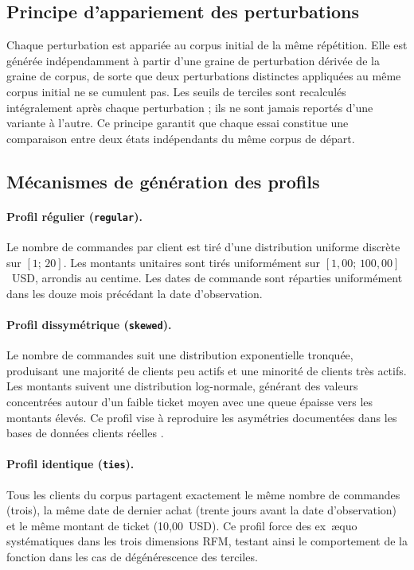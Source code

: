 \subsection{Principe d'appariement des perturbations}
\label{subsec:methodes-appariement}

Chaque perturbation est appariée au corpus initial de la même répétition. Elle est
générée indépendamment à partir d'une graine de perturbation dérivée de la graine de
corpus, de sorte que deux perturbations distinctes appliquées au même corpus initial
ne se cumulent pas. Les seuils de terciles sont recalculés intégralement après chaque
perturbation ; ils ne sont jamais reportés d'une variante à l'autre. Ce principe garantit
que chaque essai constitue une comparaison entre deux états indépendants du même corpus
de départ.

\subsection{Mécanismes de génération des profils}
\label{subsec:methodes-generateurs}

\paragraph{Profil régulier (\texttt{regular}).}
Le nombre de commandes par client est tiré d'une distribution uniforme discrète sur
$[1;\, 20]$. Les montants unitaires sont tirés uniformément sur $[1{,}00;\, 100{,}00]$~USD,
arrondis au centime. Les dates de commande sont réparties uniformément dans les douze mois
précédant la date d'observation.

\paragraph{Profil dissymétrique (\texttt{skewed}).}
Le nombre de commandes suit une distribution exponentielle tronquée, produisant une
majorité de clients peu actifs et une minorité de clients très actifs. Les montants
suivent une distribution log-normale, générant des valeurs concentrées autour d'un faible
ticket moyen avec une queue épaisse vers les montants élevés. Ce profil vise à reproduire
les asymétries documentées dans les bases de données clients réelles
\citep{Fader2005, Salminen2023}.

\paragraph{Profil identique (\texttt{ties}).}
Tous les clients du corpus partagent exactement le même nombre de commandes (trois),
la même date de dernier achat (trente jours avant la date d'observation) et le même
montant de ticket (10,00~USD). Ce profil force des ex~æquo systématiques dans les trois
dimensions RFM, testant ainsi le comportement de la fonction dans les cas de dégénérescence
des terciles.

